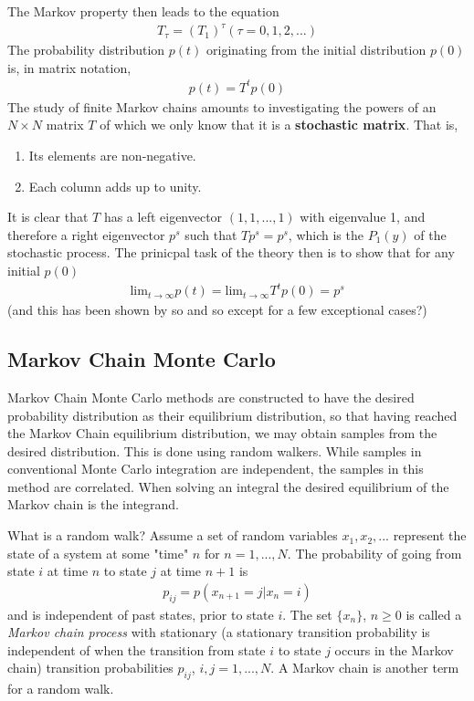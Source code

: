 \documentclass[twoside,english]{uiofysmaster}
\begin{document}
The Markov property then leads to the equation
\begin{align}
	T_\tau = (T_1)^{\tau} (\tau = 0,1,2,...)
\end{align}
The probability distribution $p(t)$ originating from the initial distribution $p(0)$ is, in matrix notation,
\begin{align}
	p(t) = T^t p(0)
\end{align}
The study of finite Markov chains amounts to investigating the powers of an $N\times N$ matrix $T$ of which we only know that it is a \textbf{stochastic matrix}. That is,
\begin{enumerate}
	\item Its elements are non-negative.
	\item Each column adds up to unity.
\end{enumerate}
It is clear that $T$ has a left eigenvector $(1,1,...,1)$ with eigenvalue 1, and therefore a right eigenvector $p^s$ such that $T p^s = p^s$, which is the $P_1(y)$ of the stochastic process.
The prinicpal task of the theory then is to show that for any initial $p(0)$
\begin{align}
	\text{lim}_{t\rightarrow \infty} p(t) = \text{lim}_{t\rightarrow \infty} T^t p(0) = p^s
\end{align}
(and this has been shown by so and so except for a few exceptional cases?)
\cite{VanKampen2007}


\subsection{Markov Chain Monte Carlo}
Markov Chain Monte Carlo methods are constructed to have the desired probability distribution as their equilibrium distribution, so that having reached the Markov Chain equilibrium distribution, we may obtain samples from the desired distribution. This is done using random walkers. While samples in conventional Monte Carlo integration are independent, the samples in this method are correlated.
When solving an integral the desired equilibrium of the Markov chain is the integrand.

What is a random walk?
Assume a set of random variables $x_1, x_2,...$ represent the state of a system at some "time" $n$ for $n=1,...,N$. The probability of going from state $i$ at time $n$ to state $j$ at time $n+1$ is
\begin{align}
	p_{ij} = p(x_{n+1} = j| x_n = i)
\end{align}
and is independent of past states, prior to state $i$. The set $\{ x_n \}$, $n\geq 0$ is called a \textit{Markov chain process} with stationary (a stationary transition probability is independent of when the transition from state $i$ to state $j$ occurs in the Markov chain) transition probabilities $p_{ij}$, $i,j=1,...,N$. A Markov chain is another term for a random walk. 
\end{document}
